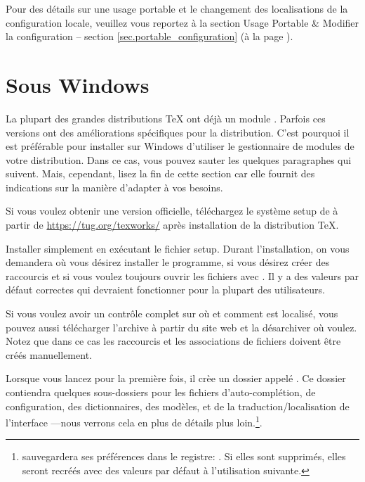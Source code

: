 Pour des détails sur une usage portable et le changement des localisations de la configuration locale, veuillez vous reportez à la section Usage Portable \& Modifier la configuration -- section \ref{sec.portable_configuration} (à la page \pageref{sec.portable_configuration}).

\section{Sous Windows}

La plupart des grandes distributions \TeX{} ont déjà un module \Tw. Parfois ces versions ont des améliorations spécifiques pour la distribution. C'est pourquoi il est préférable pour installer \Tw{} sur Windows d'utiliser le gestionnaire de modules de votre distribution. Dans ce cas, vous pouvez sauter les quelques paragraphes qui suivent. Mais, cependant, lisez la fin de cette section car elle fournit des indications sur la manière d'adapter \Tw{} à vos besoins.

Si vous voulez obtenir une version \og officielle\fg, téléchargez le système setup de \Tw{} à partir de  \url{https://tug.org/texworks/}  après installation de la distribution \TeX.

Installer simplement \Tw{} en exécutant le fichier setup. Durant l'installation, on vous demandera où vous désirez installer le programme, si vous désirez créer des raccourcis et si vous voulez toujours ouvrir les fichiers  avec \Tw. Il y a des valeurs par défaut correctes qui devraient fonctionner pour la plupart des utilisateurs.

Si vous voulez avoir un contrôle complet sur où et comment \Tw{} est localisé, vous pouvez aussi télécharger l'archive  à partir du site web et la désarchiver où voulez. Notez que dans ce cas les raccourcis et les associations de fichiers doivent être créés manuellement.

\urldef{\TwRegistryPath}

Lorsque vous lancez {\Tw} pour la première fois, il crèe un dossier appelé . Ce dossier contiendra quelques sous-dossiers pour les fichiers d'auto-complétion, de configuration, des dictionnaires, des modèles, et de la traduction/localisation de l'interface ---nous verrons cela en plus de détails plus loin.\footnote{{\Tw} sauvegardera ses préférences dans le registre:
\TwRegistryPath. Si elles sont supprimés, elles seront recréés avec des valeurs par défaut à l'utilisation suivante.}.

